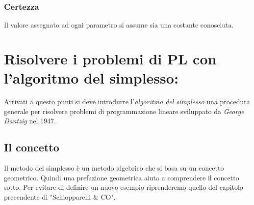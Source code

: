 \documentclass{article}
\begin{document}
      \subsubsection{Certezza}
        Il valore assegnato ad ogni parametro si assume sia una costante conosciuta.

  \section{Risolvere i problemi di PL con l'algoritmo del simplesso:}
    Arrivati a questo punti si deve introdurre l'\textit{algoritmo del simplesso} una procedura generale per risolvere problemi di programmazione lineare sviluppato da \textit{George Dantzig} nel 1947.

    \subsection{Il concetto}
      Il metodo del simplesso è un metodo algebrico che si basa su un concetto geometrico. Quindi una prefazione geometrica aiuta a comprendere il concetto sotto. Per evitare di definire un nuovo esempio riprenderemo quello del capitolo precendente di "Schiopparelli \& CO".
      
\end{document}
